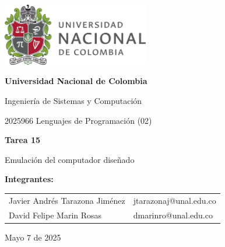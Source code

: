 \documentclass{article}
\begin{document}
\begin{titlepage}
  \centering
  \includegraphics[width=0.48\textwidth]{logo_universidad.png}
  \par\vspace{2cm}

  {\Large \textbf{Universidad Nacional de Colombia} \par}
  \vspace{0.5cm}
  {\large Ingeniería de Sistemas y Computación \par}
  {\large 2025966 Lenguajes de Programación (02)\par}
  \vspace{3cm}

  {\large \textbf{Tarea 15} \par}
  {\large Emulación del computador diseñado\par}
  \vspace{3cm}

  {\large \textbf{Integrantes:} \par}
  \vspace{0.5cm}
  \begin{tabular}{ll}
    Javier Andrés Tarazona Jiménez & jtarazonaj@unal.edu.co \\
    David Felipe Marin Rosas       & dmarinro@unal.edu.co   \\
  \end{tabular}
  \par\vspace{3cm}

  {\large Mayo 7 de 2025 \par}
\end{titlepage}

\tableofcontents %

\newpage %


\end{document}
